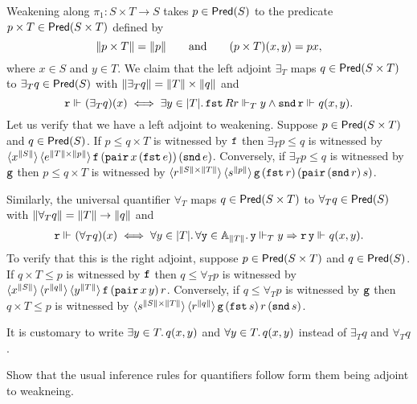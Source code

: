 Weakening along $\pi_1 : S \times T \to S$ takes $p \in \Pred{S}$ to the predicate
$p \times T \in \Pred{S \times T}$ defined by
%
\begin{equation*}
  \T{p \times T} = \T{p}
  \qquad\text{and}\qquad
  (p \times T)(x,y) = p x,
\end{equation*}
%
where $x \in S$ and $y \in T$. We claim that the left adjoint
$\exists_{T}$ maps $q \in \Pred{S \times T}$ to
$\exists_{T} q \in \Pred{S}$ with
%
$\T{\exists_{T} q} = \T{T} \times \T{q}$
%
and
%
\begin{equation*}
  \R{r} \rz (\exists_{T} q)(x)
  \iff
  \some{y \in \S{T}}
    \combFst\,R{r} \rz[T] y \land \combSnd\,\R{r} \rz q(x,y).
\end{equation*}
%
Let us verify that we have a left adjoint to weakening. Suppose $p \in
\Pred{S \times T}$ and $q \in \Pred{S}$. If $p \leq
q \times T$ is witnessed by $\R{f}$ then $\exists_{T} p
\leq q$ is witnessed by $\tpcalam{x}{\T{S}} \tpcalam{e}{\T{T} \times
    \T{p}}{\R{f}\, (\combPair \, x \, (\combFst\, e)) \, (\combSnd \, e)}$.
Conversely, if $\exists_{T} p \leq q$ is witnessed by $\R{g}$
then $p \leq q \times T$ is witnessed by $\tpcalam{r}{\T{S}
    \times \T{T}} \tpcalam{s}{\T{p}}{\R{g} \,
  (\combFst\,r)\, (\combPair \, (\combSnd \, r) \, s)}$.

Similarly, the universal quantifier $\forall_{T}$ maps $q \in
\Pred{S \times T}$ to $\forall_{T} q \in
\Pred{S}$ with $\T{\forall_{T} q} = \T{T} \to \T{q}$ and
%
\begin{align*}
  \R{r} \rz (\forall_{T} q)(x)
  \iff
    \all{y \in \S{T}} \all{\R{y} \in \Atyp{\T{T}}}
     \R{y} \rz[T] y \lthen \R{r}\,\R{y} \rz q(x,y).
\end{align*}
%
To verify that this is the right adjoint, suppose $p \in \Pred{S
  \times T}$ and $q \in \Pred{S}$. If $q \times T
\leq p$ is witnessed by $\R{f}$ then $q \leq \forall_{T} p$ is
witnessed by $\tpcalam{x}{\T{S}} \tpcalam{r}{\T{q}}
  \tpcalam{y}{\T{T}}{\R{f} \, (\combPair \, x \, y) \, r}$. Conversely,
if $q \leq \forall_{T} p$ is witnessed by $\R{g}$ then $q \times
T \leq p$ is witnessed by $\tpcalam{s}{\T{S} \times \T{T}}
  \tpcalam{r}{\T{q}}{\R{g} \, (\combFst \, s) \, r \, (\combSnd \, s)}$.

It is customary to write $\some{y \in T}{q(x,y)}$ and
$\all{y \in T}{q(x,y)}$ instead of $\exists_{T} q$ and
$\forall_{T} q$.

\begin{exercise}
  Show that the usual inference rules for quantifiers follow form them being adjoint to weakneing.
\end{exercise}


